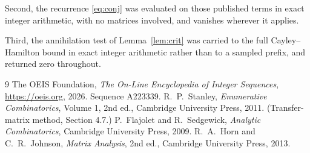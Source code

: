 \documentclass[11pt,a4paper]{article}
\theoremstyle{plain}
\theoremstyle{definition}
\begin{document}
Second, the recurrence \eqref{eq:conj} was evaluated on those published terms in exact
integer arithmetic, with no matrices involved, and vanishes wherever it applies.

Third, the annihilation test of Lemma~\ref{lem:crit} was carried to the full
Cayley--Hamilton bound in exact integer arithmetic rather than to a sampled prefix, and
returned zero throughout.

\begin{thebibliography}{9}
 The OEIS Foundation, \emph{The On-Line Encyclopedia of Integer
Sequences}, \url{https://oeis.org}, 2026. Sequence A223339.
 R.~P.~Stanley, \emph{Enumerative Combinatorics}, Volume 1, 2nd ed.,
Cambridge University Press, 2011. (Transfer-matrix method, Section 4.7.)
 P.~Flajolet and R.~Sedgewick, \emph{Analytic Combinatorics}, Cambridge
University Press, 2009.
 R.~A.~Horn and C.~R.~Johnson, \emph{Matrix Analysis}, 2nd ed., Cambridge
University Press, 2013.
\end{thebibliography}
\end{document}
